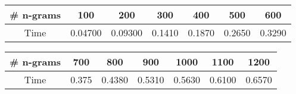 \begin{tabular}{|c|c|c|c|c|c|c|}
\hline 
\# n-grams & 100& 200& 300& 400& 500& 600\\ 
\hline 
Time& 0.04700& 0.09300& 0.1410& 0.1870& 0.2650& 0.3290\\ 
\hline 
\end{tabular}
 
\begin{tabular}{|c|c|c|c|c|c|c|}
\hline 
\# n-grams & 700& 800& 900& 1000& 1100& 1200\\ 
\hline 
Time& 0.375& 0.4380& 0.5310& 0.5630& 0.6100& 0.6570\\ 
\hline 
\end{tabular}